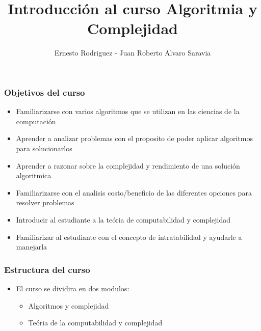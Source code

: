 \documentclass{beamer}
\title[Introducciòn]{Introducci\'on al curso Algoritmia y Complejidad}
\author{Ernesto Rodriguez - Juan Roberto Alvaro Saravia}
\institute{
    Universidad Francisco Marroquin \\
    \medskip \textit{ernestorodriguez@ufm.edu - juanalvarado@ufm.edu}
}
\date[\today]{}
\begin{document}
\begin{frame}
\titlepage
\end{frame}

\begin{frame}
    \frametitle{Objetivos del curso}
    \begin{itemize}
        \item{Familiarizarse con varios algoritmos que se
        utilizan en las ciencias de la computaci\'on}
        \item{Aprender a analizar problemas con el proposito
        de poder aplicar algoritmos para solucionarlos}
        \item{Aprender a razonar sobre la complejidad y
        rendimiento de una soluci\'on algoritmica}
        \item{Familiarizarse con el analisis costo/beneficio
        de las diferentes opciones para resolver problemas}
        \item{Introducir al estudiante a la te\'oria de
        computabilidad y complejidad}
        \item{Familiarizar al estudiante con el concepto de
        intratabilidad y ayudarle a manejarla}
    \end{itemize}
\end{frame}

\begin{frame}
    \frametitle{Estructura del curso}
    \begin{itemize}
        \item{El curso se dividira en dos modulos:
        \begin{itemize}
            \item{Algoritmos y complejidad}
            \item{Te\'oria de la computabilidad y complejidad}
        \end{itemize}
        }
    \end{itemize}
\end{frame}
\end{document}

